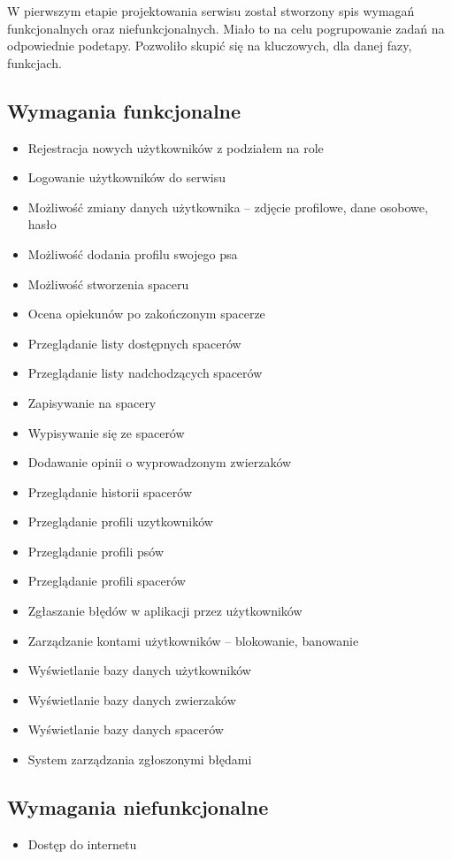 W pierwszym etapie projektowania serwisu został stworzony spis wymagań funkcjonalnych oraz niefunkcjonalnych. Miało to na celu pogrupowanie zadań na odpowiednie podetapy. Pozwoliło skupić się na kluczowych, dla danej fazy, funkcjach.
\subsection{Wymagania funkcjonalne}
\begin{itemize}
    \item Rejestracja nowych użytkowników z podziałem na role
    \item Logowanie użytkowników do serwisu
    \item Możliwość zmiany danych użytkownika -- zdjęcie profilowe, dane osobowe, hasło
    \item Możliwość dodania profilu swojego psa
    \item Możliwość stworzenia spaceru
    \item Ocena opiekunów po zakończonym spacerze
    \item Przeglądanie listy dostępnych spacerów
    \item Przeglądanie listy nadchodzących spacerów
    \item Zapisywanie na spacery
    \item Wypisywanie się ze spacerów
    \item Dodawanie opinii o wyprowadzonym zwierzaków
    \item Przeglądanie historii spacerów
    \item Przeglądanie profili uzytkowników
    \item Przeglądanie profili psów
    \item Przeglądanie profili spacerów
    \item Zgłaszanie błędów w aplikacji przez użytkowników
    \item Zarządzanie kontami użytkowników -- blokowanie, banowanie
    \item Wyświetlanie bazy danych użytkowników
    \item Wyświetlanie bazy danych zwierzaków
    \item Wyświetlanie bazy danych spacerów
    \item System zarządzania zgłoszonymi błędami
\end{itemize}
\subsection{Wymagania niefunkcjonalne}
\begin{itemize}
    \item Dostęp do internetu
\end{itemize}
